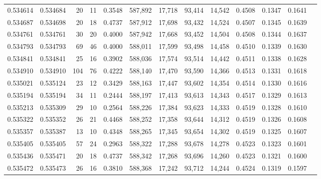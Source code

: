 \begin{tabular}{rrrrrrrrrrrrr}
0.534614 & 0.534684 &    20 &    11 &                                     0.3548 & 587,892 &  17,718 &  93,414 &  14,542 & 0.4508 & 0.1347 & 0.1641 \\
0.534687 & 0.534698 &    20 &    18 &                                     0.4737 & 587,912 &  17,698 &  93,432 &  14,524 & 0.4507 & 0.1345 & 0.1639 \\
0.534761 & 0.534761 &    30 &    20 &                                     0.4000 & 587,942 &  17,668 &  93,452 &  14,504 & 0.4508 & 0.1344 & 0.1637 \\
0.534793 & 0.534793 &    69 &    46 &                                     0.4000 & 588,011 &  17,599 &  93,498 &  14,458 & 0.4510 & 0.1339 & 0.1630 \\
0.534841 & 0.534841 &    25 &    16 &                                     0.3902 & 588,036 &  17,574 &  93,514 &  14,442 & 0.4511 & 0.1338 & 0.1628 \\
0.534910 & 0.534910 &   104 &    76 &                                     0.4222 & 588,140 &  17,470 &  93,590 &  14,366 & 0.4513 & 0.1331 & 0.1618 \\
0.535021 & 0.535124 &    23 &    12 &                                     0.3429 & 588,163 &  17,447 &  93,602 &  14,354 & 0.4514 & 0.1330 & 0.1616 \\
0.535194 & 0.535194 &    34 &    11 &                                     0.2444 & 588,197 &  17,413 &  93,613 &  14,343 & 0.4517 & 0.1329 & 0.1613 \\
0.535213 & 0.535309 &    29 &    10 &                                     0.2564 & 588,226 &  17,384 &  93,623 &  14,333 & 0.4519 & 0.1328 & 0.1610 \\
0.535322 & 0.535352 &    26 &    21 &                                     0.4468 & 588,252 &  17,358 &  93,644 &  14,312 & 0.4519 & 0.1326 & 0.1608 \\
0.535357 & 0.535387 &    13 &    10 &                                     0.4348 & 588,265 &  17,345 &  93,654 &  14,302 & 0.4519 & 0.1325 & 0.1607 \\
0.535405 & 0.535405 &    57 &    24 &                                     0.2963 & 588,322 &  17,288 &  93,678 &  14,278 & 0.4523 & 0.1323 & 0.1601 \\
0.535436 & 0.535471 &    20 &    18 &                                     0.4737 & 588,342 &  17,268 &  93,696 &  14,260 & 0.4523 & 0.1321 & 0.1600 \\
0.535472 & 0.535473 &    26 &    16 &                                     0.3810 & 588,368 &  17,242 &  93,712 &  14,244 & 0.4524 & 0.1319 & 0.1597 \\

\end{tabular}
